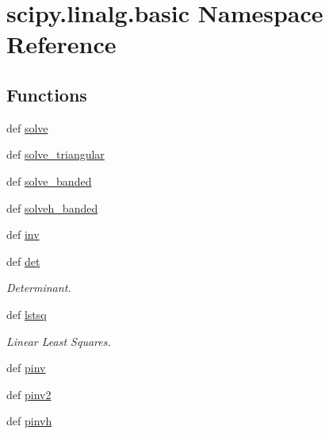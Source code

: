 \hypertarget{namespacescipy_1_1linalg_1_1basic}{}\section{scipy.\+linalg.\+basic Namespace Reference}
\label{namespacescipy_1_1linalg_1_1basic}
\subsection*{Functions}
\begin{DoxyCompactItemize}
\item 
def \hyperlink{namespacescipy_1_1linalg_1_1basic_a618dc480e14a814fd4a2395ba53b50e7}{solve}
\item 
def \hyperlink{namespacescipy_1_1linalg_1_1basic_a017b69b8ff66f4b8757018bfadd02873}{solve\+\_\+triangular}
\item 
def \hyperlink{namespacescipy_1_1linalg_1_1basic_a35092781d6681b7b40d8dd45f2a9790d}{solve\+\_\+banded}
\item 
def \hyperlink{namespacescipy_1_1linalg_1_1basic_af5fd739c7537dc4779eb2e674d8b83a5}{solveh\+\_\+banded}
\item 
def \hyperlink{namespacescipy_1_1linalg_1_1basic_ad2f6be11d92b6c15702a14760d933d53}{inv}
\item 
def \hyperlink{namespacescipy_1_1linalg_1_1basic_a92ff1fe000b99eb230692b1ed4edfe0c}{det}
\begin{DoxyCompactList}\small\item\em Determinant. \end{DoxyCompactList}\item 
def \hyperlink{namespacescipy_1_1linalg_1_1basic_a866b938265017a8d18ba074a81ccd81b}{lstsq}
\begin{DoxyCompactList}\small\item\em Linear Least Squares. \end{DoxyCompactList}\item 
def \hyperlink{namespacescipy_1_1linalg_1_1basic_ab6ce4e24deea881fa02e1cab48cd4dc6}{pinv}
\item 
def \hyperlink{namespacescipy_1_1linalg_1_1basic_a7686761d4c79362e6ad6a99bbc437465}{pinv2}
\item 
def \hyperlink{namespacescipy_1_1linalg_1_1basic_a3ad70f66a6c3436a94808defd328cbe0}{pinvh}
\end{DoxyCompactItemize}
